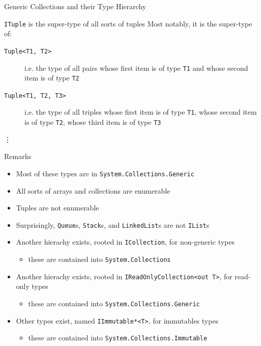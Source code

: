 \documentclass[presentation]{beamer}
\begin{document}
\begin{frame}[allowframebreaks]{Generic Collections and their Type Hierarchy}
  \begin{block}{\texttt{ITuple} is the super-type of all sorts of tuples}
    Most notably, it is the super-type of:
    \begin{description}
      \item[\texttt{Tuple<T1, T2>}] i.e. the type of all \alert{pairs} whose \alert{first} item is of type \alert{\texttt{T1}} and whose \alert{second} item is of type \alert{\texttt{T2}}
      \item[\texttt{Tuple<T1, T2, T3>}] i.e. the type of all \alert{triples} whose \alert{first} item is of type \alert{\texttt{T1}}, whose \alert{second} item is of type \alert{\texttt{T2}}, whose \alert{third} item is of type \alert{\texttt{T3}}
      \item[\vdots]
    \end{description}
  \end{block}

  \begin{block}{Remarks}
    \begin{itemize}
      \item Most of these types are in \texttt{System.Collections.Generic}
      \item All \alert{sorts} of \alert{arrays} and collections are \alert{enumerable}
      \item Tuples are \alert{not} enumerable
      \item Surprisingly, \texttt{Queue}s, \texttt{Stack}s, and \texttt{LinkedList}s are \alert{not} \texttt{IList}s
      \item Another hierachy exists, rooted in \texttt{ICollection}, for \alert{non-generic} types
      \begin{itemize}
        \item these are contained into \texttt{System.Collections}
      \end{itemize}

      \item Another hierachy exists, rooted in \texttt{IReadOnlyCollection<out T>}, for \alert{read-only} types
      \begin{itemize}
        \item these are contained into \texttt{System.Collections.Generic}
      \end{itemize}

      \item Other types exist, named \texttt{IImmutable*<T>}, for \alert{immutables} types
      \begin{itemize}
        \item these are contained into \texttt{System.Collections.Immutable}
      \end{itemize}
    \end{itemize}
  \end{block}
\end{frame}
\end{document}
